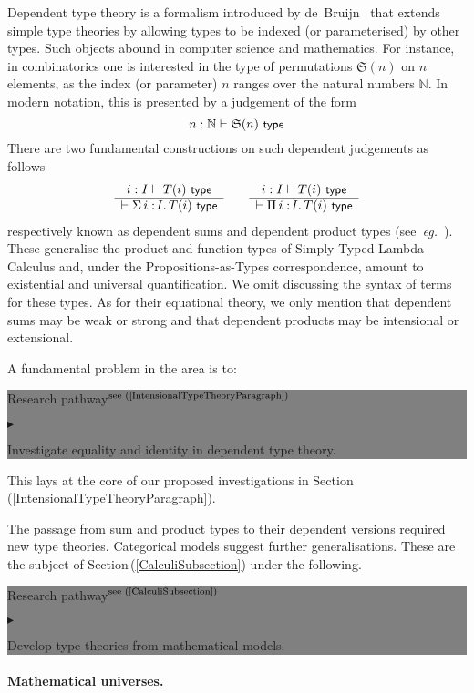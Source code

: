 \documentclass[11pt,twocolumn]{article}
\newenvironment{btritemize}
  {\begin{list}{\btr}
  {\setlength{\topsep}{2pt}
   \setlength{\partopsep}{2pt}
   \setlength{\itemsep}{2.5pt}
   \setlength{\parsep}{2.5pt}
   \setlength{\leftmargin}{1em}
   \setlength{\labelwidth}{.5em}}}
  {\end{list}}
\newcommand{\mysf}{\small\sf}
\newcommand{\mytextsf}[1]{\textsf{\small #1}}
\newcommand{\pref}[1]{\,(\ref{#1})}
\newcommand{\eg}{\emph{eg.}}
\newcommand{\btr}{$\blacktriangleright$}
\newcommand{\reqpsize}{8.113395cm}%
\newcommand{\rep}[2]{\begin{center}\colorbox{grey}{\begin{minipage}{\reqpsize}
  \mytextsf{Research pathway}\hfill$^{\mbox{\scriptsize see #1 }}$\\[-5.5mm]
  \begin{btritemize}
  \item #2
  \end{btritemize}
\end{minipage}}\end{center}}
\begin{document}
Dependent type theory is a formalism introduced by
de~Bruijn~\cite{deBruijn} that extends simple type theories by
allowing types to be indexed (or parameterised) by other types.  Such
objects abound in computer science and mathematics.  For instance, in
combinatorics one is interested in the type of permutations $\mathfrak
S(n)$ on $n$ elements, as the index (or parameter) $n$ ranges over the
natural numbers $\mathbb N$.  In modern notation, this is presented by a
judgement of the form
  \[
  n:\mathbb N \vdash \mathfrak S(n) \mbox{ \mysf type}
\]
There are two fundamental constructions on such dependent judgements as
follows
  \[
  \begin{array}{c}
  i: I \vdash T(i) \mbox{ \mysf type}
  \\ \hline
  \vdash \Sigma\,{i:\!I}.\, T(i) \mbox{ \mysf type}
  \end{array}
  \qquad
  \begin{array}{c}
  i: I \vdash T(i) \mbox{ \mysf type}
  \\ \hline
  \vdash \Pi\,{i:\!I}.\, T(i) \mbox{ \mysf type}
  \end{array}
\]
respectively known as dependent sums and dependent product types
(see~\eg~\cite{Jacobs}).  These generalise the product and function types of
Simply-Typed Lambda Calculus and, under the Propositions-as-Types
correspondence, amount to existential and universal quantification.  We omit
discussing the syntax of terms for these types.  As for their equational
theory, we only mention that dependent sums may be weak or strong and that
dependent products may be intensional or extensional.

A fundamental problem in the area is to:
\rep{(\ref{IntensionalTypeTheoryParagraph})}
  {Investigate equality and identity in dependent type theory.}
This lays at the core of our proposed investigations in
Section\pref{IntensionalTypeTheoryParagraph}.

The passage from sum and product types to their dependent versions
required new type theories.  Categorical models suggest further
generalisations.  These are the subject of
Section\pref{CalculiSubsection}
under the following. 
\rep{(\ref{CalculiSubsection})}
  {Develop type theories from mathematical models.}

\paragraph{Mathematical universes.}
\label{MathematicalUniversesParagraph}
\end{document}
